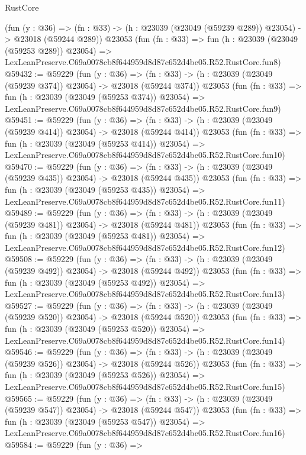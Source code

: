 \begin{lexlean}{RustCore}
\begin{coremodule}
    (fun (y : @36) =>
    (fn : @33) -> (h : @23039 (@23049 (@59239 @289)) @23054) -> @23018 (@59244 @289))
    @23053
    (fun (fn : @33) =>
    fun (h : @23039 (@23049 (@59253 @289)) @23054) =>
    LexLeanPreserve.C69a0078cb8f644959d8d87c652d4be05.R52.RustCore.fun8)
@59432 := @59229
    (fun (y : @36) =>
    (fn : @33) -> (h : @23039 (@23049 (@59239 @374)) @23054) -> @23018 (@59244 @374))
    @23053
    (fun (fn : @33) =>
    fun (h : @23039 (@23049 (@59253 @374)) @23054) =>
    LexLeanPreserve.C69a0078cb8f644959d8d87c652d4be05.R52.RustCore.fun9)
@59451 := @59229
    (fun (y : @36) =>
    (fn : @33) -> (h : @23039 (@23049 (@59239 @414)) @23054) -> @23018 (@59244 @414))
    @23053
    (fun (fn : @33) =>
    fun (h : @23039 (@23049 (@59253 @414)) @23054) =>
    LexLeanPreserve.C69a0078cb8f644959d8d87c652d4be05.R52.RustCore.fun10)
@59470 := @59229
    (fun (y : @36) =>
    (fn : @33) -> (h : @23039 (@23049 (@59239 @435)) @23054) -> @23018 (@59244 @435))
    @23053
    (fun (fn : @33) =>
    fun (h : @23039 (@23049 (@59253 @435)) @23054) =>
    LexLeanPreserve.C69a0078cb8f644959d8d87c652d4be05.R52.RustCore.fun11)
@59489 := @59229
    (fun (y : @36) =>
    (fn : @33) -> (h : @23039 (@23049 (@59239 @481)) @23054) -> @23018 (@59244 @481))
    @23053
    (fun (fn : @33) =>
    fun (h : @23039 (@23049 (@59253 @481)) @23054) =>
    LexLeanPreserve.C69a0078cb8f644959d8d87c652d4be05.R52.RustCore.fun12)
@59508 := @59229
    (fun (y : @36) =>
    (fn : @33) -> (h : @23039 (@23049 (@59239 @492)) @23054) -> @23018 (@59244 @492))
    @23053
    (fun (fn : @33) =>
    fun (h : @23039 (@23049 (@59253 @492)) @23054) =>
    LexLeanPreserve.C69a0078cb8f644959d8d87c652d4be05.R52.RustCore.fun13)
@59527 := @59229
    (fun (y : @36) =>
    (fn : @33) -> (h : @23039 (@23049 (@59239 @520)) @23054) -> @23018 (@59244 @520))
    @23053
    (fun (fn : @33) =>
    fun (h : @23039 (@23049 (@59253 @520)) @23054) =>
    LexLeanPreserve.C69a0078cb8f644959d8d87c652d4be05.R52.RustCore.fun14)
@59546 := @59229
    (fun (y : @36) =>
    (fn : @33) -> (h : @23039 (@23049 (@59239 @526)) @23054) -> @23018 (@59244 @526))
    @23053
    (fun (fn : @33) =>
    fun (h : @23039 (@23049 (@59253 @526)) @23054) =>
    LexLeanPreserve.C69a0078cb8f644959d8d87c652d4be05.R52.RustCore.fun15)
@59565 := @59229
    (fun (y : @36) =>
    (fn : @33) -> (h : @23039 (@23049 (@59239 @547)) @23054) -> @23018 (@59244 @547))
    @23053
    (fun (fn : @33) =>
    fun (h : @23039 (@23049 (@59253 @547)) @23054) =>
    LexLeanPreserve.C69a0078cb8f644959d8d87c652d4be05.R52.RustCore.fun16)
@59584 := @59229
    (fun (y : @36) =>

\end{coremodule}
\end{lexlean}
